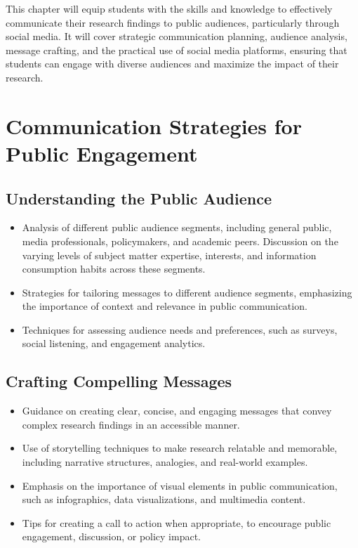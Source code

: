 \documentclass[
]{book}
\begin{document}
This chapter will equip students with the skills and knowledge to effectively communicate their research findings to public audiences, particularly through social media. It will cover strategic communication planning, audience analysis, message crafting, and the practical use of social media platforms, ensuring that students can engage with diverse audiences and maximize the impact of their research.

\hypertarget{communication-strategies-for-public-engagement}{%
\section*{Communication Strategies for Public Engagement}\label{communication-strategies-for-public-engagement}}

\hypertarget{understanding-the-public-audience}{%
\subsection*{Understanding the Public Audience}\label{understanding-the-public-audience}}

\begin{itemize}
\item
  Analysis of different public audience segments, including general public, media professionals, policymakers, and academic peers. Discussion on the varying levels of subject matter expertise, interests, and information consumption habits across these segments.
\item
  Strategies for tailoring messages to different audience segments, emphasizing the importance of context and relevance in public communication.
\item
  Techniques for assessing audience needs and preferences, such as surveys, social listening, and engagement analytics.
\end{itemize}

\hypertarget{crafting-compelling-messages}{%
\subsection*{Crafting Compelling Messages}\label{crafting-compelling-messages}}

\begin{itemize}
\item
  Guidance on creating clear, concise, and engaging messages that convey complex research findings in an accessible manner.
\item
  Use of storytelling techniques to make research relatable and memorable, including narrative structures, analogies, and real-world examples.
\item
  Emphasis on the importance of visual elements in public communication, such as infographics, data visualizations, and multimedia content.
\item
  Tips for creating a call to action when appropriate, to encourage public engagement, discussion, or policy impact.
\end{itemize}
\end{document}
